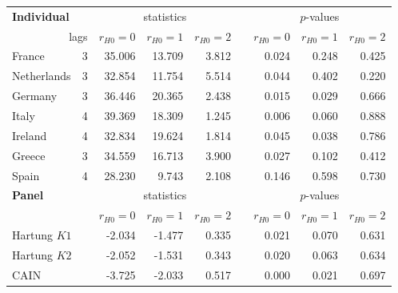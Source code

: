 \begin{tabular}{lrrrrrrrr}
	\hline \hline
	\multicolumn{2}{l}{ \textbf{Individual} } & \multicolumn{3}{c}{ statistics } &  & \multicolumn{3}{c}{ $ p $-values } \\
	\cline{3-5} \cline{7-9}
	\multicolumn{2}{r}{ lags } & $ r_{H0} = 0 $ & $ r_{H0} = 1 $ & $ r_{H0} = 2 $ &   & $ r_{H0} = 0 $ & $ r_{H0} = 1 $ & $ r_{H0} = 2 $ \\
	\hline
	France & 3 & 35.006 & 13.709 &  3.812 &   & 0.024 & 0.248 & 0.425 \\
	Netherlands & 3 & 32.854 & 11.754 &  5.514 &   & 0.044 & 0.402 & 0.220 \\
	Germany & 3 & 36.446 & 20.365 &  2.438 &   & 0.015 & 0.029 & 0.666 \\
	Italy & 4 & 39.369 & 18.309 &  1.245 &   & 0.006 & 0.060 & 0.888 \\
	Ireland & 4 & 32.834 & 19.624 &  1.814 &   & 0.045 & 0.038 & 0.786 \\
	Greece & 3 & 34.559 & 16.713 &  3.900 &   & 0.027 & 0.102 & 0.412 \\
	Spain & 4 & 28.230 &  9.743 &  2.108 &   & 0.146 & 0.598 & 0.730 \\
	 \hline
	\multicolumn{2}{l}{ \textbf{Panel} } & \multicolumn{3}{c}{ statistics } &  & \multicolumn{3}{c}{ $ p $-values } \\
	\cline{3-5} \cline{7-9}
	  &   & $ r_{H0} = 0 $ & $ r_{H0} = 1 $ & $ r_{H0} = 2 $ &   & $ r_{H0} = 0 $ & $ r_{H0} = 1 $ & $ r_{H0} = 2 $ \\
	\hline
	\multicolumn{2}{l}{Hartung $K1$} & -2.034 & -1.477 &  0.335 &   & 0.021 & 0.070 & 0.631 \\
	\multicolumn{2}{l}{Hartung $K2$} & -2.052 & -1.531 &  0.343 &   & 0.020 & 0.063 & 0.634 \\
	\multicolumn{2}{l}{CAIN} & -3.725 & -2.033 &  0.517 &   & 0.000 & 0.021 & 0.697 \\
	\hline \hline
\end{tabular}
